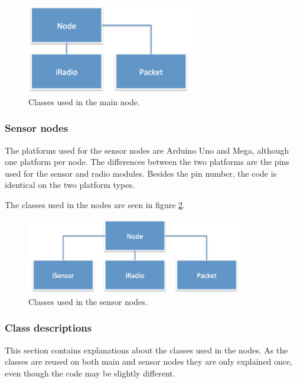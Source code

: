 \begin{figure}[h!]
\centering
\includegraphics[width=0.65\textwidth]{chapters/implementation/figures/mainnodeClass.png}
\caption{Classes used in the main node.}
\label{fig:mainnodeClass}
\end{figure}

\subsubsection*{Sensor nodes}
The platforms used for the sensor nodes are Arduino Uno and Mega, although one platform per node. The differences between the two platforms are the pins used for the sensor and radio modules. Besides the pin number, the code is identical on the two platform types. 

The classes used in the nodes are seen in figure \ref{fig:nodeClass}.
\begin{figure}[h!]
\centering
\includegraphics[width=0.85\textwidth]{chapters/implementation/figures/nodeClass.png}
\caption{Classes used in the sensor nodes.}
\label{fig:nodeClass}
\end{figure}


\subsubsection*{Class descriptions}
This section contains explanations about the classes used in the nodes. As the classes are reused on both main and sensor nodes they are only explained once, even though the code may be slightly different.

